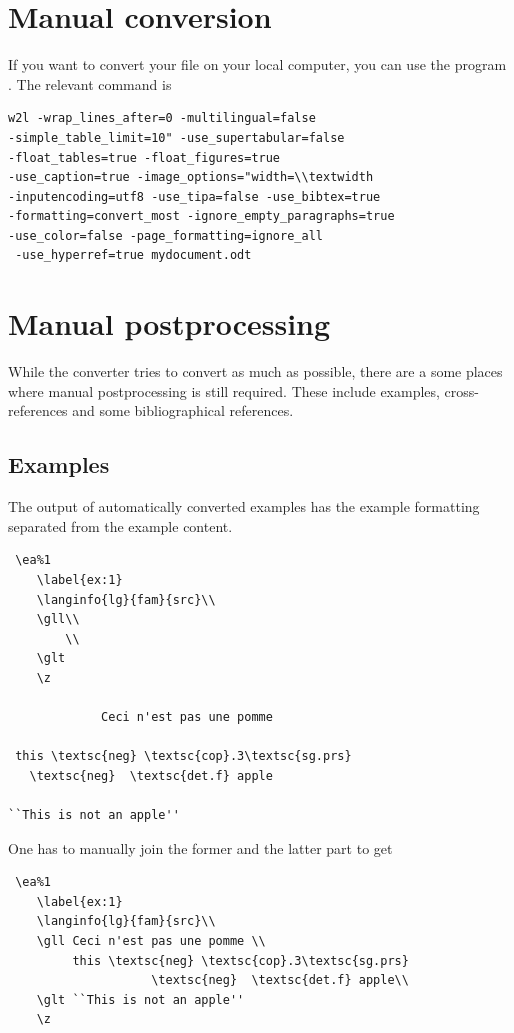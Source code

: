 \section{Manual conversion}
If you want to convert your file on your local computer, you can use the program . The relevant command is 
\begin{verbatim}
w2l -wrap_lines_after=0 -multilingual=false 
-simple_table_limit=10" -use_supertabular=false 
-float_tables=true -float_figures=true 
-use_caption=true -image_options="width=\\textwidth 
-inputencoding=utf8 -use_tipa=false -use_bibtex=true  
-formatting=convert_most -ignore_empty_paragraphs=true 
-use_color=false -page_formatting=ignore_all
 -use_hyperref=true mydocument.odt
\end{verbatim}

\section{Manual postprocessing}
While the converter tries to convert as much as possible, there are a some places where manual postprocessing is still required.
These include examples, cross-references and some bibliographical references.

\subsection{Examples}
The output of automatically converted examples has the example formatting separated from the example content.  
\begin{verbatim}
 \ea%1
    \label{ex:1}
    \langinfo{lg}{fam}{src}\\
    \gll\\
        \\
    \glt
    \z

             Ceci n'est pas une pomme

 this \textsc{neg} \textsc{cop}.3\textsc{sg.prs}  
   \textsc{neg}  \textsc{det.f} apple

``This is not an apple''
\end{verbatim}

One has to manually join the former and the latter part to get

\begin{verbatim}
 \ea%1
    \label{ex:1}
    \langinfo{lg}{fam}{src}\\
    \gll Ceci n'est pas une pomme \\
         this \textsc{neg} \textsc{cop}.3\textsc{sg.prs} 
                    \textsc{neg}  \textsc{det.f} apple\\
    \glt ``This is not an apple''
    \z 
\end{verbatim}


